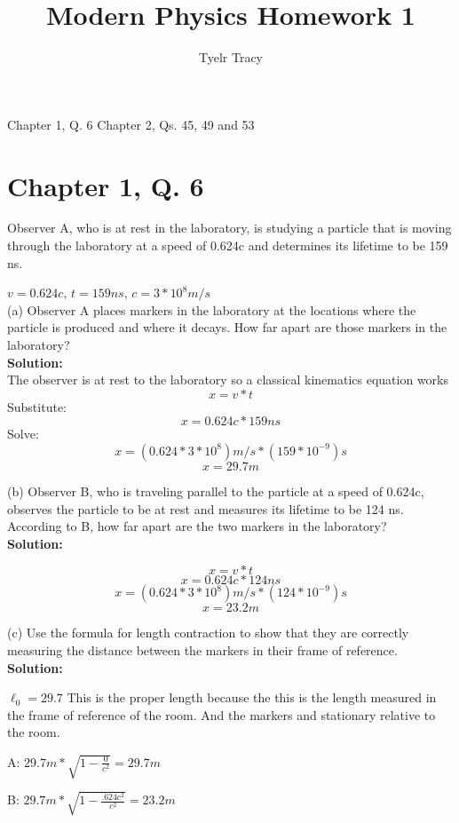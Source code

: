\documentclass{article}
\title{Modern Physics Homework 1}
\author{Tyelr Tracy}
\begin{document}
\maketitle

Chapter 1, Q. 6
Chapter 2, Qs. 45, 49 and 53

\section*{Chapter 1, Q. 6}

Observer A, who is at rest in the laboratory, is studying a
particle that is moving through the laboratory at a speed of
0.624c and determines its lifetime to be 159 ns.

$v = 0.624c$, $t = 159 ns$, $c = 3*10^8 m/s$ \\

(a) Observer A places markers in the laboratory at the locations where
the particle is produced and where it decays. How far apart
are those markers in the laboratory? \\

\textbf{Solution:} \\
The observer is at rest to the laboratory so a classical kinematics equation works
$$ x = v * t $$
Substitute:
$$ x = 0.624c * 159 ns $$
Solve:
$$ x = (0.624 * 3 * 10^8) m/s * (159 * 10^{-9})s  $$
$$ x = 29.7 m  $$


(b) Observer B, who is traveling parallel to the particle at a speed of 0.624c,
observes the particle to be at rest and measures its lifetime to
be 124 ns. According to B, how far apart are the two markers
in the laboratory? \\

\textbf{Solution:}

$$ x = v * t $$
$$ x = 0.624c * 124 ns $$
$$ x = (0.624 * 3 * 10^8) m/s * (124 * 10^{-9})s  $$
$$ x = 23.2 m  $$


(c) Use the formula for length contraction to show that they are correctly measuring the distance between the markers in their frame of reference. \\

\textbf{Solution:}


$ \ell_0 =  29.7 $ This is the proper length because the this is the length measured in the frame of reference of the room. And the markers and stationary relative to the room.


A: $29.7m * \sqrt{1 - \frac{0}{c^2}} = 29.7m$

B: $29.7m * \sqrt{1 - \frac{.624c^2}{c^2}} = 23.2m$ \\
\end{document}
